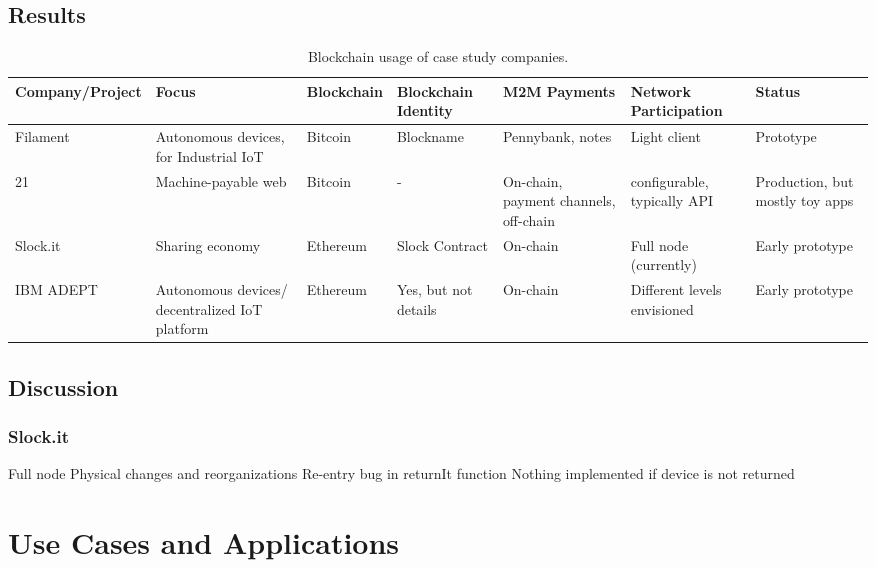 \subsection{Results}

\begin{table}[\tiny]
\centering
\label{my-label}
\begin{tabular}[\tiny]{@{}lp{1.5 cm}lp{1.5 cm}p{1.5 cm}p{1.5 cm}p{1.5 cm}@{}}
\toprule
Company/Project & Focus                                          & Blockchain & Blockchain Identity  & M2M Payments     & Network Participation       & Status                          \\ \midrule
Filament        & Autonomous devices, for Industrial IoT          & Bitcoin    & Blockname            & Pennybank, notes              & Light client                & Prototype                       \\
21              & Machine-payable web                            & Bitcoin    & -                    & On-chain, payment channels, off-chain              & configurable, typically API & Production, but mostly toy apps \\
Slock.it        & Sharing economy                                & Ethereum   & Slock Contract       & On-chain & Full node (currently)       & Early prototype                 \\
IBM ADEPT       & Autonomous devices/ decentralized IoT platform & Ethereum   & Yes, but not details & On-chain              & Different levels envisioned & Early prototype                 \\ \bottomrule
\end{tabular}
\caption{Blockchain usage of case study companies.}
\end{table}

\subsection{Discussion}

\subsubsection{Slock.it}


Full node
Physical changes and reorganizations
Re-entry bug in returnIt function
Nothing implemented if device is not returned


\section{Use Cases and Applications}

